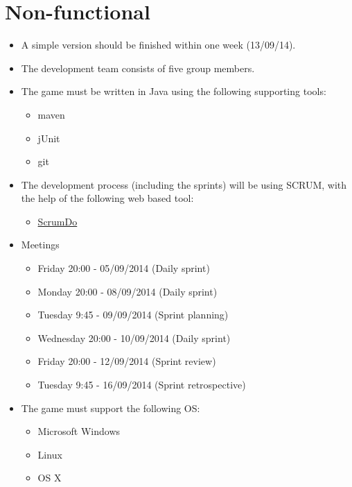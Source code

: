 \documentclass[a4paper,11pt]{article}
\begin{document}
\section*{Non-functional}
\begin{itemize}
  \item A simple version should be finished within one week (13/09/14).
  \item The development team consists of five group members.
  \item The game must be written in Java using the following supporting tools:
  \begin{itemize}
    \item maven
    \item jUnit
    \item git
  \end{itemize}

  \item The development process (including the sprints) will be using SCRUM, with the help of the following web based tool:
  \begin{itemize}
    \item \href{https://www.scrumdo.com/}{ScrumDo}
  \end{itemize}

  \item Meetings
  \begin{itemize}
    \item Friday 20:00 - 05/09/2014 (Daily sprint)
    \item Monday 20:00 - 08/09/2014 (Daily sprint)
    \item Tuesday 9:45 - 09/09/2014 (Sprint planning)
    \item Wednesday 20:00 - 10/09/2014 (Daily sprint)
    \item Friday 20:00 - 12/09/2014 (Sprint review)
    \item Tuesday 9:45 - 16/09/2014 (Sprint retrospective)
  \end{itemize}

  \item The game must support the following OS:
  \begin{itemize}
    \item Microsoft Windows
    \item Linux
    \item OS X
  \end{itemize}
\end{itemize}
\end{document}
